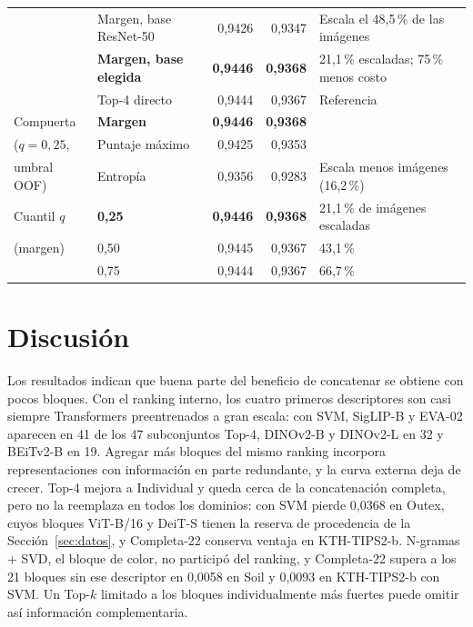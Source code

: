 \documentclass[a4paper,fleqn]{cas-sc}
\begin{document}
\begin{table}[pos=htbp]
\begin{tabular}{@{}llrrp{5.2cm}@{}}
 & Margen, base ResNet-50 & 0,9426 & 0,9347 & Escala el 48,5\,\% de las imágenes \\
 & \textbf{Margen, base elegida} & \textbf{0,9446} & \textbf{0,9368} & 21,1\,\% escaladas; 75\,\% menos costo \\
 & Top-4 directo & 0,9444 & 0,9367 & Referencia \\
\addlinespace
Compuerta & \textbf{Margen} & \textbf{0,9446} & \textbf{0,9368} & \\
($q=0{,}25$, & Puntaje máximo & 0,9425 & 0,9353 & \\
umbral OOF) & Entropía & 0,9356 & 0,9283 & Escala menos imágenes (16,2\,\%) \\
\addlinespace
Cuantil $q$ & \textbf{0,25} & \textbf{0,9446} & \textbf{0,9368} & 21,1\,\% de imágenes escaladas \\
(margen) & 0,50 & 0,9445 & 0,9367 & 43,1\,\% \\
 & 0,75 & 0,9444 & 0,9367 & 66,7\,\% \\
\bottomrule
\end{tabular}
\end{table}
\FloatBarrier

\section{Discusión}\label{sec:discusion}

Los resultados indican que buena parte del beneficio de concatenar se obtiene con pocos bloques. Con el ranking interno, los cuatro primeros descriptores son casi siempre Transformers preentrenados a gran escala: con SVM, SigLIP-B y EVA-02 aparecen en 41 de los 47 subconjuntos Top-4, DINOv2-B y DINOv2-L en 32 y BEiTv2-B en 19. Agregar más bloques del mismo ranking incorpora representaciones con información en parte redundante, y la curva externa deja de crecer. Top-4 mejora a Individual y queda cerca de la concatenación completa, pero no la reemplaza en todos los dominios: con SVM pierde 0,0368 en Outex, cuyos bloques ViT-B/16 y DeiT-S tienen la reserva de procedencia de la Sección~\ref{sec:datos}, y Completa-22 conserva ventaja en KTH-TIPS2-b. N-gramas + SVD, el bloque de color, no participó del ranking, y Completa-22 supera a los 21 bloques sin ese descriptor en 0,0058 en Soil y 0,0093 en KTH-TIPS2-b con SVM. Un Top-$k$ limitado a los bloques individualmente más fuertes puede omitir así información complementaria.
\end{document}
